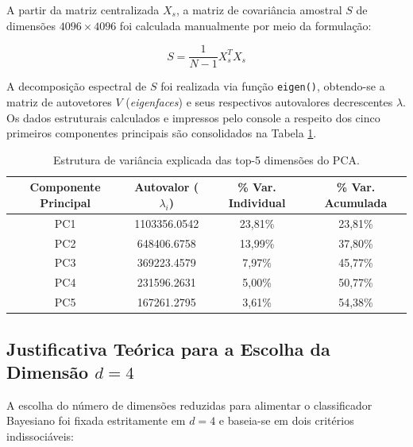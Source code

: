 \documentclass[12pt]{article}
\begin{document}
A partir da matriz centralizada $X_s$, a matriz de covariância amostral $S$ de dimensões $4096 \times 4096$ foi calculada manualmente por meio da formulação:

$$S = \frac{1}{N-1} X_s^T X_s$$

A decomposição espectral de $S$ foi realizada via função \texttt{eigen()}, obtendo-se a matriz de autovetores $V$ (\textit{eigenfaces}) e seus respectivos autovalores decrescentes $\lambda$. Os dados estruturais calculados e impressos pelo console a respeito dos cinco primeiros componentes principais são consolidados na Tabela \ref{tab:pca_structure}.

\begin{table}[H]
\centering
\caption{Estrutura de variância explicada das top-5 dimensões do PCA.}
\label{tab:pca_structure}
\begin{tabular}{@{}cccc@{}}
\toprule
\textbf{Componente Principal} & \textbf{Autovalor ($\lambda_i$)} & \textbf{\% Var. Individual} & \textbf{\% Var. Acumulada} \\ \midrule
PC1 & 1103356.0542 & 23,81\% & 23,81\% \\
PC2 & 648406.6758  & 13,99\% & 37,80\% \\
PC3 & 369223.4579  & 7,97\%  & 45,77\% \\
PC4 & 231596.2631  & 5,00\%  & 50,77\% \\
PC5 & 167261.2795  & 3,61\%  & 54,38\% \\ \bottomrule
\end{tabular}
\end{table}

\subsection{Justificativa Teórica para a Escolha da Dimensão $d=4$}

A escolha do número de dimensões reduzidas para alimentar o classificador Bayesiano foi fixada estritamente em $d = 4$ e baseia-se em dois critérios indissociáveis:
\end{document}

